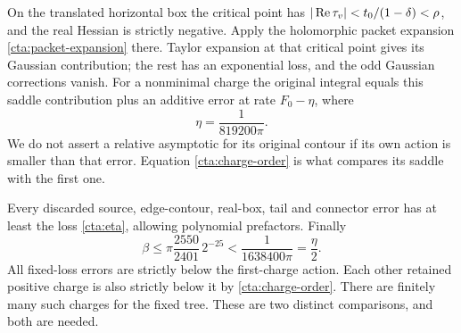 On the translated horizontal box the critical point has
\(|\operatorname{Re}\tau_v|<t_0/(1-\delta)<\rho\), and the real Hessian
is strictly negative. Apply the holomorphic packet expansion
\eqref{cta:packet-expansion} there. Taylor expansion at that
critical point gives its Gaussian contribution; the rest has
an exponential loss, and the odd Gaussian corrections vanish.
For a nonminimal charge the original integral equals this
saddle contribution plus an additive error at rate
\(F_0-\eta\), where
\begin{equation}\label{cta:eta}
 \eta=\frac1{819200\pi}.
\end{equation}
We do not assert a relative asymptotic for its original
contour if its own action is smaller than that error.
Equation \eqref{cta:charge-order} is what compares its saddle
with the first one.

Every discarded source, edge-contour, real-box, tail and
connector error has at least the loss \eqref{cta:eta}, allowing
polynomial prefactors. Finally
\begin{equation}\label{cta:budget}
 \beta\le\pi\frac{2550}{2401}\,2^{-25}
                      <\frac1{1638400\pi}=\frac\eta2.
\end{equation}
All fixed-loss errors are strictly below the first-charge
action. Each other retained positive charge is also strictly
below it by \eqref{cta:charge-order}. There are finitely many
such charges for the fixed tree. These are two distinct
comparisons, and both are needed.
